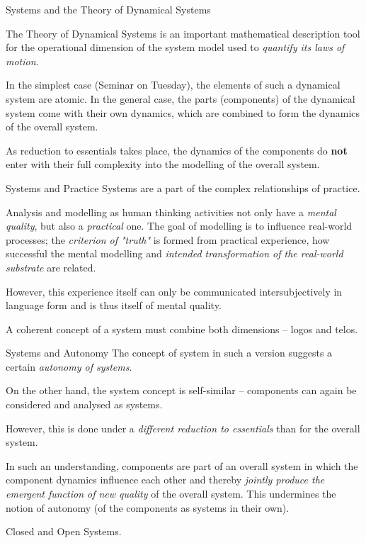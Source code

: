 \documentclass{beamer}
\begin{document}
\begin{frame}{Systems and the Theory of Dynamical Systems}

  The Theory of Dynamical Systems is an important mathematical description
  tool for the operational dimension of the system model used to
  \emph{quantify its laws of motion}.

  In the simplest case (Seminar on Tuesday), the elements of such a dynamical
  system are atomic. In the general case, the parts (components) of the
  dynamical system come with their own dynamics, which are combined to form
  the dynamics of the overall system.

  As reduction to essentials takes place, the dynamics of the components do
  \textbf{not} enter with their full complexity into the modelling of the
  overall system.
\end{frame}

\begin{frame}{Systems and Practice}
Systems are a part of the complex relationships of practice.

Analysis and modelling as human thinking activities not only have a
\emph{mental quality}, but also a \emph{practical} one. The goal of modelling
is to influence real-world processes; the \emph{criterion of "truth"} is
formed from practical experience, how successful the mental modelling and
\emph{intended transformation of the real-world substrate} are related.

However, this experience itself can only be communicated intersubjectively in
language form and is thus itself of mental quality.

A coherent concept of a system must combine both dimensions -- logos and
telos.
\end{frame}

\begin{frame}{Systems and Autonomy}
The concept of system in such a version suggests a certain \emph{autonomy of
  systems}.

On the other hand, the system concept is self-similar -- components can again
be considered and analysed as systems.

However, this is done under a \emph{different reduction to essentials} than
for the overall system.

In such an understanding, components are part of an overall system in which
the component dynamics influence each other and thereby \emph{jointly produce
  the emergent function of new quality} of the overall system. This undermines
the notion of autonomy (of the components as systems in their own).

Closed and Open Systems.   
\end{frame}
\end{document}
